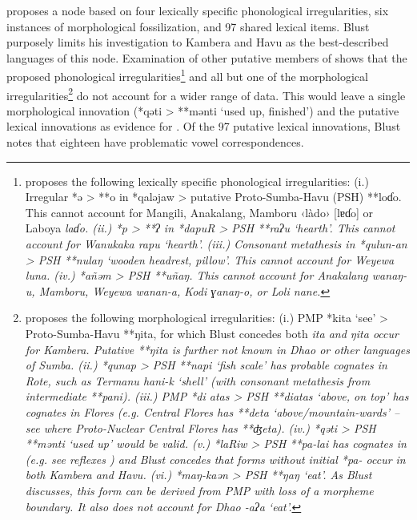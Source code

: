 \citet{Blust2008} proposes a  node based on four
lexically specific phonological irregularities,
six instances of morphological fossilization,
and 97 shared lexical items.
Blust purposely limits his investigation to Kambera
and Havu as the best-described languages of this node.
Examination of other putative members of  shows
that the proposed phonological irregularities\footnote{
		\citet[90]{Blust2008}
		proposes the following lexically specific phonological irregularities:
		(i.) Irregular *ə > **o in *qaləjaw > putative Proto-Sumba-Havu (PSH) **loɗo.
		This cannot account for Mangili,
		Anakalang, Mamboru ‹làdo› [lɐɗo] or Laboya \it{laɗo}.
		(ii.) *p > **ʔ in *dapuR > PSH **raʔu ‘hearth’.
		This cannot account for Wanukaka \it{rapu} ‘hearth’.
		(iii.) Consonant metathesis in *qulun-an > PSH **nulaŋ ‘wooden headrest, pillow’.
		This cannot account for Weyewa \it{luna}.
		(iv.) *añəm > PSH **uñaŋ.
		This cannot account for Anakalang \it{wanaŋ-u},
		Mamboru, Weyewa \it{wanan-a}, Kodi \it{ɣanaŋ-o},
		or Loli \it{nane}.} 
and all but one of the morphological irregularities\footnote{
		\citet[91]{Blust2008}
		proposes the following morphological irregularities: (i.) PMP
		*kita ‘see’ > Proto-Sumba-Havu **ŋita,
		for which Blust concedes both \it{ita}
		and \it{ŋita} occur for Kambera.
		Putative **ŋita is further not known in Dhao or other languages of Sumba.
		(ii.) *qunap > PSH **napi ‘fish scale’ has probable cognates
		in Rote, such as Termanu \it{hani-k} ‘shell’ (with consonant metathesis from intermediate **pani).
		(iii.) PMP *di atas > PSH **diatas ‘above,
		on top’ has cognates in Flores (e.g.
		Central Flores has **deta ‘above/mountain-wards’ -- see 
		where Proto-Nuclear Central Flores has **ʤeta).
		(iv.) *qəti > PSH **mənti ‘used up’ would be valid.
		(v.) *laRiw > PSH **pa-lai has cognates in  (e.g.
		see reflexes  )
		and Blust concedes that forms without initial *pa- occur in both Kambera and Havu.
		(vi.) *maŋ-kaən > PSH **ŋaŋ ‘eat’.
		As Blust discusses, this form can be derived from PMP with loss
		of a morpheme boundary.
		It also does not account for Dhao \it{-aʔa} ‘eat’.}
		do not account
for a wider range of data.
This would leave a single morphological innovation (*qəti > **mənti
‘used up, finished’) and the putative lexical innovations as evidence for .
Of the 97 putative lexical innovations,
Blust notes that eighteen have problematic vowel correspondences.
